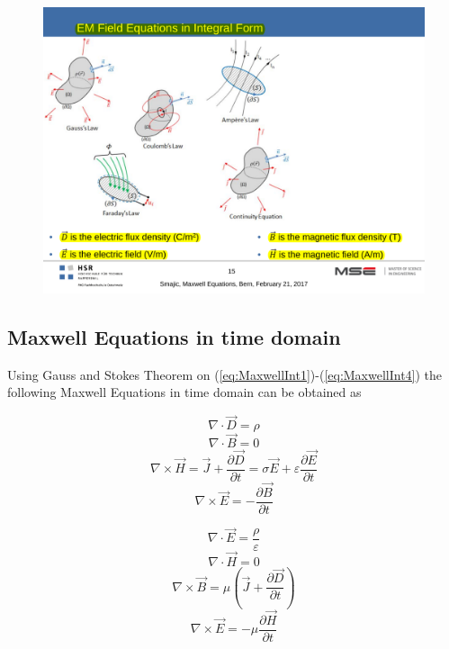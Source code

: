 \begin{figure}[h!]
	\centering
	\includegraphics[width=.7\textwidth]{./images/MaxwellEqImages.pdf}
\end{figure}

\subsection{Maxwell Equations in time domain}
Using Gauss and Stokes Theorem on (\ref{eq:MaxwellInt1})-(\ref{eq:MaxwellInt4}) the following Maxwell Equations in time domain can be obtained as 
\begin{multicols}{2}
	\begin{equation}
		\nabla \cdot \vec{D} = \rho
		\label{eq:MaxwellDiff1_1}
	\end{equation}
	\begin{equation}
		\nabla \cdot \vec{B} = 0
		\label{eq:MaxwellDiff1_2}
	\end{equation}
	\begin{equation}
		\nabla \times \vec{H} = \vec{J} + \frac{\partial \vec{D}}{\partial t} = \sigma \vec{E} + \varepsilon \frac{\partial \vec{E}}{\partial t}
		\label{eq:MaxwellDiff1_3}
	\end{equation}
	\begin{equation}
		\nabla \times \vec{E} = - \frac{\partial \vec{B}}{\partial t}
		\label{eq:MaxwellDiff1_4}
	\end{equation}
	
	\begin{equation}
		\nabla \cdot \vec{E} = \frac{\rho}{\varepsilon}
		\label{eq:MaxwellDiff2_1}
	\end{equation}
	\begin{equation}
		\nabla \cdot \vec{H} = 0
		\label{eq:MaxwellDiff2_2}
	\end{equation}
	\begin{equation}
		\nabla \times \vec{B} = \mu\left(\vec{J} + \frac{\partial \vec{D}}{\partial t}\right)
		\label{eq:MaxwellDiff2_3}
	\end{equation}
	\begin{equation}
		\nabla \times \vec{E} = -\mu \frac{\partial \vec{H}}{\partial t}
		\label{eq:MaxwellDiff2_4}
	\end{equation}
\end{multicols}


